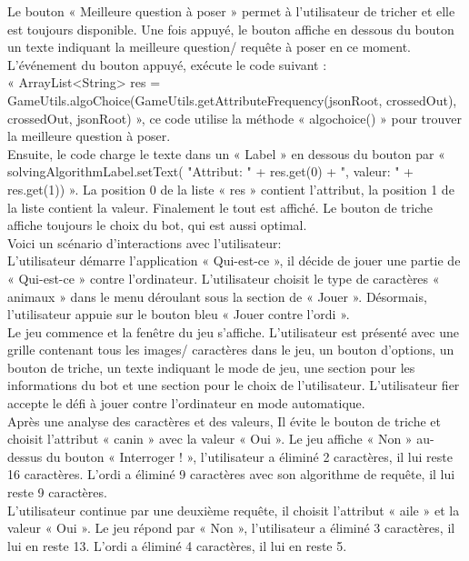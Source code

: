 \documentclass[a4paper]{article}
\begin{document}
Le bouton « Meilleure question à poser » permet à l’utilisateur de tricher et elle est toujours disponible. Une fois appuyé, le bouton affiche en dessous du bouton un texte indiquant la meilleure question/ requête à poser en ce moment.\\
L'événement du bouton appuyé, exécute le code suivant :\\ « ArrayList<String> res = GameUtils.algoChoice(GameUtils.getAttributeFrequency(jsonRoot, crossedOut), crossedOut, jsonRoot) », ce code utilise la méthode « algochoice() » pour trouver la meilleure question à poser.\\
Ensuite, le code charge le texte dans un « Label » en dessous du bouton par « solvingAlgorithmLabel.setText( "Attribut: " + res.get(0) + ", valeur: " + res.get(1)) ». La position 0 de la liste « res » contient l’attribut, la position 1 de la liste contient la valeur. Finalement le tout est affiché. Le bouton de triche affiche toujours le choix du bot, qui est aussi optimal.\\

Voici un scénario d’interactions avec l’utilisateur:\\
L’utilisateur démarre l’application « Qui-est-ce », il décide de jouer une partie de « Qui-est-ce » contre l’ordinateur. L’utilisateur choisit le type de caractères « animaux » dans le menu déroulant sous la section de « Jouer ». Désormais, l’utilisateur appuie sur le bouton bleu « Jouer contre l’ordi ».\\

Le jeu commence et la fenêtre du jeu s’affiche. L’utilisateur est présenté avec une grille contenant tous les images/ caractères dans le jeu, un bouton d’options, un bouton de triche, un texte indiquant le mode de jeu, une section pour les informations du bot et une section pour le choix de l’utilisateur. L’utilisateur fier accepte le défi à jouer contre l’ordinateur en mode automatique.\\

Après une analyse des caractères et des valeurs, Il évite le bouton de triche et choisit l’attribut « canin » avec la valeur « Oui ». Le jeu affiche « Non » au-dessus du bouton « Interroger ! », l’utilisateur a éliminé 2 caractères, il lui reste 16 caractères. L’ordi a éliminé 9 caractères avec son algorithme de requête, il lui reste 9 caractères.\\

L’utilisateur continue par une deuxième requête, il choisit l’attribut « aile » et la valeur « Oui ». Le jeu répond par « Non », l’utilisateur a éliminé 3 caractères, il lui en reste 13. L’ordi a éliminé 4 caractères, il lui en reste 5.\\
\end{document}
